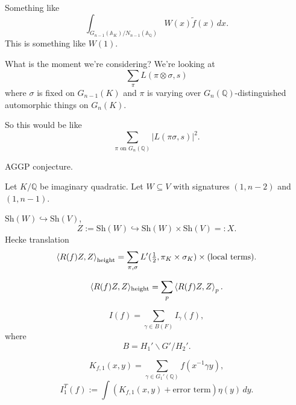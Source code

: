 \documentclass[reqno]{amsart} 
\begin{document}
Something like
\begin{equation*}
\int_{G_{n - 1}(\mathbb{A}_K) / N_{n - 1}(\mathbb{A}_{\mathbb{Q}})} W(x) \tilde{f}(x) \, d x.
\end{equation*}
This is something like $W(1)$.

What is the moment we're considering?  We're looking at
\begin{equation*}
  \sum_{\pi } L(\pi \otimes \sigma, s)
\end{equation*}
where $\sigma$ is fixed on $G_{n-1}(K)$ and $\pi$ is varying over $G_n(\mathbb{Q})$-distinguished automorphic things on $G_n(K)$.

So this would be like
\begin{equation*}
  \sum_{\pi \text{ on } G_n(\mathbb{Q})}
  \lvert L(\pi \sigma, s ) \rvert^2.
\end{equation*}


AGGP conjecture.

Let $K /\mathbb{Q}$ be imaginary quadratic.  Let $W \subseteq V$ with signatures $(1, n - 2)$ and $(1, n - 1)$.

$\mathrm{Sh}(W) \hookrightarrow \mathrm{Sh}(V)$,
\begin{equation*}
  Z := \mathrm{Sh}(W) \hookrightarrow \mathrm{Sh}(W) \times \mathrm{Sh}(V) =: X.
\end{equation*}
Hecke translation
\begin{equation*}
\left\langle R(f) Z, Z \right\rangle_{\operatorname{height}} = \sum_{\pi, \sigma} L '(\tfrac{1}{2}, \pi_K \times \sigma_K ) \times (\text{local terms}).
\end{equation*}

\begin{equation*}
\langle R(f) Z, Z \rangle_{\operatorname{height}} = \sum_p \left\langle R(f) Z , Z \right\rangle_p.
\end{equation*}

\begin{equation*}
I(f) = \sum_{\gamma \in B(F)} I_\gamma(f),
\end{equation*}
where
\begin{equation*}
B = H_1 ' \backslash G ' / H_2 '.
\end{equation*}

\begin{equation*}
K_{f, 1}(x, y) = \sum_{\gamma \in G_1 '(\mathbb{Q})} f(x^{-1} \gamma y),
\end{equation*}
\begin{equation*}
I_1^T(f) := \int (K_{f, 1}(x, y) + \text{error term}) \eta(y) \, d y.
\end{equation*}
\end{document}

